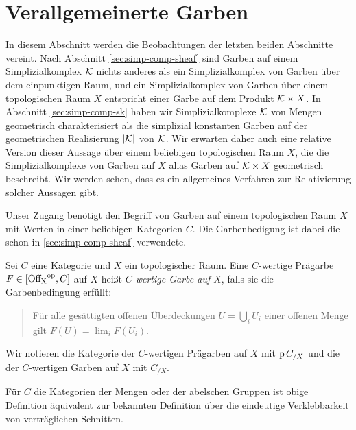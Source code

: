 
\section{Verallgemeinerte Garben}
\label{sec:gen-sheaves}

In diesem Abschnitt werden die Beobachtungen der letzten beiden
Abschnitte vereint. Nach Abschnitt \autoref{sec:simp-comp-sheaf} sind
Garben auf einem Simplizialkomplex $\mathcal{K}$ nichts anderes als ein
Simplizialkomplex von Garben über dem einpunktigen Raum, und ein
Simplizialkomplex von Garben über einem topologischen Raum $X$
entspricht einer Garbe auf dem Produkt $\mathcal{K} \times X$. In Abschnitt
\autoref{sec:simp-comp-sk} haben wir Simplizialkomplexe $\mathcal{K}$ von
Mengen geometrisch charakterisiert als die simplizial konstanten
Garben auf der geometrischen Realisierung $|\mathcal{K}|$ von $\mathcal{K}$. Wir
erwarten daher auch eine relative Version dieser Aussage über einem
beliebigen topologischen Raum $X$, die die Simplizialkomplexe von
Garben auf $X$ alias Garben auf $\mathcal{K} \times X$ geometrisch
beschreibt. Wir werden sehen, dass es ein allgemeines Verfahren zur
Relativierung solcher Aussagen gibt.

Unser Zugang benötigt den Begriff von Garben auf einem topologischen
Raum $X$ mit Werten in einer beliebigen Kategorien $C$. Die
Garbenbedigung ist dabei die schon in \autoref{sec:simp-comp-sheaf}
verwendete.
\begin{defn}[\cite{TG}, 2.1.5]
  Sei $C$ eine Kategorie und $X$ ein topologischer Raum. Eine
  $C$-wertige Prägarbe $F \in [\operatorname{Off_X}^\mathrm{op}, C]$ auf $X$ heißt
  \emph{$C$-wertige Garbe auf $X$}, falls sie die Garbenbedingung
  erfüllt:
  \begin{quote}
    Für alle gesättigten offenen Überdeckungen $U = \bigcup_i U_i$
    einer offenen Menge gilt $F(U) = \lim_i F(U_i)$.
  \end{quote}
\end{defn}
Wir notieren die Kategorie der $C$-wertigen Prägarben auf $X$ mit $\operatorname{p}
C_{/X}$ und die der $C$-wertigen Garben auf $X$ mit $C_{/X}$.

Für $C$ die Kategorien der Mengen oder der abelschen Gruppen ist obige
Definition äquivalent zur bekannten Definition über die eindeutige
Verklebbarkeit von verträglichen Schnitten.

